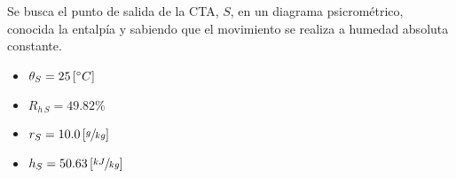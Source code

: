 \documentclass[11pt]{article}
\begin{document}
Se busca el punto de salida de la CTA, $ S $, en un diagrama psicrométrico, conocida la entalpía y sabiendo que el movimiento se realiza a humedad absoluta constante.

\begin{itemize}
    \item
    $ \theta _S = 25 \left[ \degree C \right] $

    \item
    $ R_{ h \, S } = 49.82\% $

    \item
    $ r_S = 10.0 \left[ \sfrac{ g }{ kg } \right] $

    \item
    $ h_S = 50.63 \left[ \sfrac{ kJ }{ kg } \right] $

\end{itemize}

\end{document}
